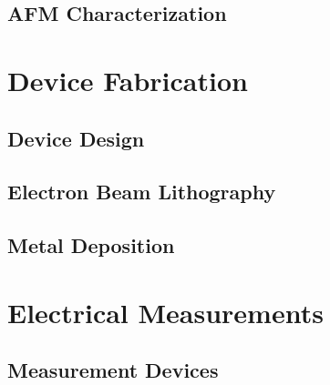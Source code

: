 \subsection{AFM Characterization}\label{subsec:characterization_afm}


\section{Device Fabrication}\label{sec:device_fabrication}
\subsection{Device Design}\label{subsec:device_design}
\subsection{Electron Beam Lithography}\label{subsec:lithography}
\subsection{Metal Deposition}\label{subsec:deposition}


\section{Electrical Measurements}\label{sec:measurements}
\subsection{Measurement Devices}\label{subsec:measurement_devices}

